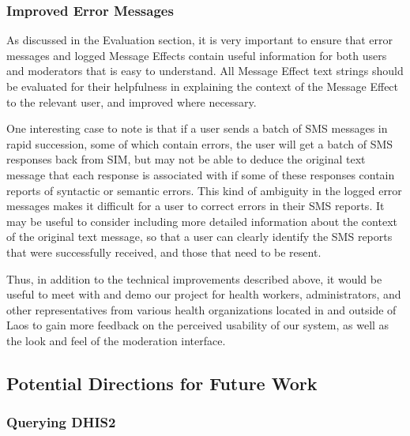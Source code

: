 \documentclass{acm_proc_article-sp}
\begin{document}
\subsubsection{Improved Error Messages}

As discussed in the Evaluation section, it is very important to ensure that error messages and logged Message Effects contain useful information for both users and moderators that is easy to understand. All Message Effect text strings should be evaluated for their helpfulness in explaining the context of the Message Effect to the relevant user, and improved where necessary. 

One interesting case to note is that if a user sends a batch of SMS messages in rapid succession, some of which contain errors, the user will get a batch of SMS responses back from SIM, but may not be able to deduce the original text message that each response is associated with if some of these responses contain reports of syntactic or semantic errors. This kind of ambiguity in the logged error messages makes it difficult for a user to correct errors in their SMS reports. It may be useful to consider including more detailed information about the context of the original text message, so that a user can clearly identify the SMS reports that were successfully received, and those that need to be resent.

Thus, in addition to the technical improvements described above, it would be useful to meet with and demo our project for health workers, administrators, and other representatives from various health organizations located in and outside of Laos to gain more feedback on the perceived usability of our system, as well as the look and feel of the moderation interface.

\subsection{Potential Directions for Future Work}

\subsubsection{Querying DHIS2}
\end{document}

